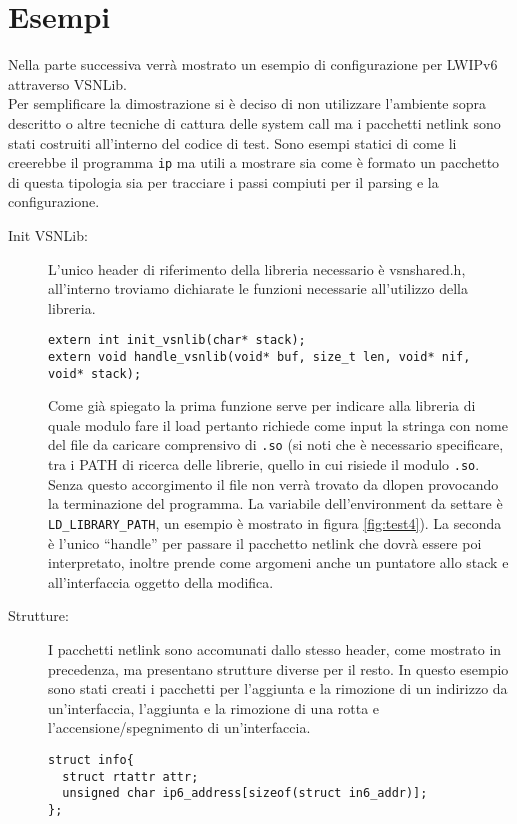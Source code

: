 \section{Esempi}                 %
Nella parte successiva verr\`a mostrato un esempio di configurazione per LWIPv6 attraverso VSNLib.\\
Per semplificare la dimostrazione si \`e deciso di non utilizzare l'ambiente sopra descritto o altre tecniche di cattura delle system call ma i pacchetti netlink sono stati costruiti all'interno del codice di test. Sono esempi statici di come li creerebbe il programma \texttt{ip} ma utili a mostrare sia come \`e formato un pacchetto di questa tipologia sia per tracciare i passi compiuti per il parsing e la configurazione.
\begin{description}
\item[Init VSNLib: ]L'unico header di riferimento della libreria necessario \`e vsnshared.h, all'interno troviamo dichiarate le funzioni necessarie all'utilizzo della libreria.
\begin{lstlisting}[style=CStyle]
extern int init_vsnlib(char* stack);
extern void handle_vsnlib(void* buf, size_t len, void* nif, void* stack);
\end{lstlisting}
Come gi\`a spiegato la prima funzione serve per indicare alla libreria di quale modulo fare il load pertanto richiede come input la stringa con nome del file da caricare comprensivo di \texttt{.so} (si noti che \`e necessario specificare, tra i PATH di ricerca delle librerie, quello in cui risiede il modulo \texttt{.so}. Senza questo accorgimento il file non verr\`a trovato da dlopen provocando la terminazione del programma. La variabile dell'environment da settare \`e \texttt{LD\_LIBRARY\_PATH}, un esempio \`e mostrato in figura \ref{fig:test4}).
La seconda \`e l'unico ``handle'' per passare il pacchetto netlink che dovr\`a essere poi interpretato, inoltre prende come argomeni anche un puntatore allo stack e all'interfaccia oggetto della modifica.
\item[Strutture: ]I pacchetti netlink sono accomunati dallo stesso header, come mostrato in precedenza, ma presentano strutture diverse per il resto. In questo esempio sono stati creati i pacchetti per l'aggiunta e la rimozione di un indirizzo da un'interfaccia, l'aggiunta e la rimozione di una rotta e l'accensione/spegnimento di un'interfaccia.
\begin{lstlisting}[style=CStyle]
struct info{
  struct rtattr attr;
  unsigned char ip6_address[sizeof(struct in6_addr)];
};


\end{lstlisting}
\end{description}
